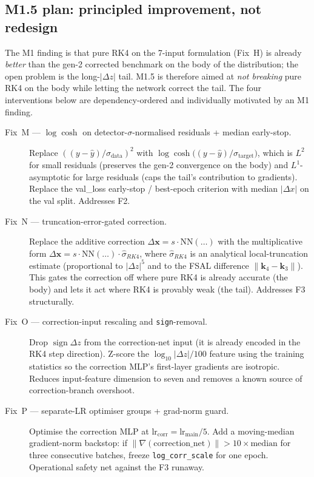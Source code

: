\documentclass[a4paper,11pt]{article}
\newcommand{\dz}{\Delta z}
\begin{document}
\subsection{M1.5 plan: principled improvement, not redesign}
\label{gen3:sec:m1_5_plan}

The M1 finding is that pure RK4 on the 7-input formulation
(Fix~H) is already \emph{better} than the gen-2 corrected
benchmark on the body of the distribution; the open problem is
the long-$|\dz|$ tail.  M1.5 is therefore aimed at \emph{not
breaking} pure RK4 on the body while letting the network correct
the tail.  The four interventions below are dependency-ordered
and individually motivated by an M1 finding.

\begin{description}
  \item[Fix~M --- $\log\cosh$ on detector-$\sigma$-normalised
    residuals + median early-stop.]
    Replace $((y-\hat y)/\sigma_\mathrm{data})^2$ with
    $\log\cosh\!\big((y-\hat y)/\sigma_\mathrm{target}\big)$, which
    is $L^2$ for small residuals (preserves the gen-2 convergence
    on the body) and $L^1$-asymptotic for large residuals (caps
    the tail's contribution to gradients).  Replace the val\_loss
    early-stop / best-epoch criterion with median $|\Delta x|$ on
    the val split.  Addresses F2.
  \item[Fix~N --- truncation-error-gated correction.]
    Replace the additive correction
    $\Delta\mathbf{x}=s\cdot \mathrm{NN}(\dots)$ with the
    multiplicative form
    $\Delta\mathbf{x}=s\cdot \mathrm{NN}(\dots)\cdot\hat\sigma_{RK4}$,
    where $\hat\sigma_{RK4}$ is an analytical local-truncation
    estimate (proportional to $|\dz|^5$ and to the FSAL
    difference $\|\mathbf{k}_4-\mathbf{k}_3\|$).  This gates the
    correction off where pure RK4 is already accurate (the body)
    and lets it act where RK4 is provably weak (the tail).
    Addresses F3 structurally.
  \item[Fix~O --- correction-input rescaling and \texttt{sign}-removal.]
    Drop $\operatorname{sign}\dz$ from the correction-net input
    (it is already encoded in the RK4 step direction).  Z-score
    the $\log_{10}|\dz|/100$ feature using the training
    statistics so the correction MLP's first-layer gradients are
    isotropic.  Reduces input-feature dimension to seven and
    removes a known source of correction-branch overshoot.
  \item[Fix~P --- separate-LR optimiser groups + grad-norm guard.]
    Optimise the correction MLP at $\mathrm{lr}_\mathrm{corr}=
    \mathrm{lr}_\mathrm{main}/5$.  Add a moving-median gradient-norm
    backstop: if $\|\nabla(\mathrm{correction\_net})\|>
    10\times\mathrm{median}$ for three consecutive batches,
    freeze \texttt{log\_corr\_scale} for one epoch.  Operational
    safety net against the F3 runaway.
\end{description}
\end{document}
